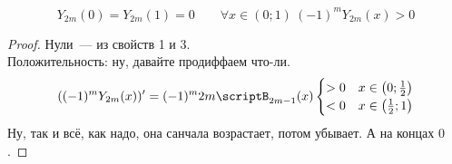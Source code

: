 \documentclass{article}
\begin{document}
    \begin{property}[Нули и знаки $Y_{2m}(x)=\scriptB_{2m}(x)-B_{2m}$]
        $$
        Y_{2m}(0)=Y_{2m}(1)=0\qquad \forall x\in(0;1)~(-1)^mY_{2m}(x)>0
        $$
    \end{property}
    \begin{proof}
        Нули~--- из свойств 1 и 3.\\
        Положительность: ну, давайте продиффаем что-ли.
        $$
        ((-1)^mY_{2m}(x))'=(-1)^m2m\scriptB_{2m-1}(x)\begin{cases}
            >0&x\in\left(0;\frac12\right)\\
            <0&x\in\left(\frac12;1\right)
        \end{cases}
        $$
        Ну, так и всё, как надо, она санчала возрастает, потом убывает. А на концах $0$.
    \end{proof}
\end{document}
